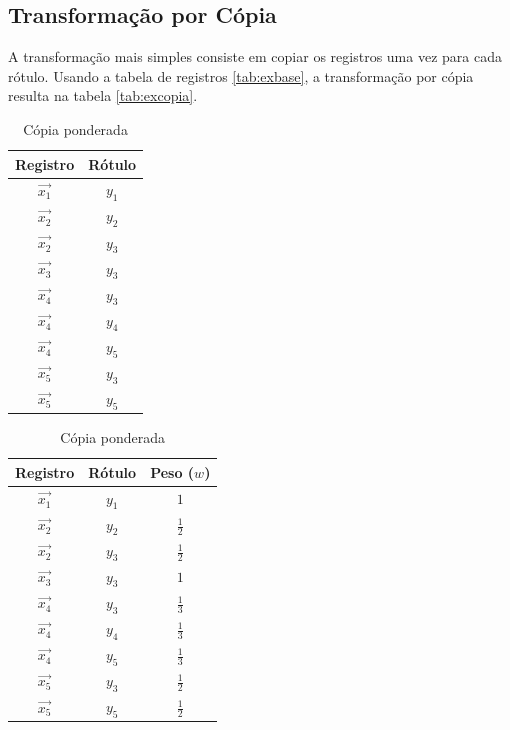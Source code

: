 \documentclass[runningheads,a4paper]{llncs}
\begin{document}
\subsection{Transformação por Cópia} \label{subsec:copia}

A transformação mais simples consiste em copiar os registros uma vez para cada rótulo. Usando a tabela de registros \ref{tab:exbase}, a transformação por cópia resulta na tabela \ref{tab:excopia}.

\begin{table}
\parbox{.45\linewidth}{
	\centering
	\begin{tabular}{| c | c |}
		\hline
		\textbf{Registro} & \textbf{Rótulo} \\
		\hline
		$\vec{x_1}$ & $y_1$ \\
		\hline
		$\vec{x_2}$ & $y_2$ \\
		\hline
		$\vec{x_2}$ & $y_3$ \\
		\hline
		$\vec{x_3}$ & $y_3$ \\
		\hline
		$\vec{x_4}$ & $y_3$ \\
		\hline
		$\vec{x_4}$ & $y_4$ \\
		\hline
		$\vec{x_4}$ & $y_5$ \\
		\hline
		$\vec{x_5}$ & $y_3$ \\
		\hline
		$\vec{x_5}$ & $y_5$ \\
		\hline
	\end{tabular}
	\caption{Transformação por cópia}
	\label{tab:excopia}
}
\parbox{.45\linewidth}{
	\centering
	\begin{tabular}{| c | c | c |}
		\hline
		\textbf{Registro} & \textbf{Rótulo} & \textbf{Peso ($w$)} \\
		\hline
		$\vec{x_1}$ & $y_1$ & $1$ \\
		\hline
		$\vec{x_2}$ & $y_2$ & $\frac{1}{2}$ \\
		\hline
		$\vec{x_2}$ & $y_3$ & $\frac{1}{2}$ \\
		\hline
		$\vec{x_3}$ & $y_3$ & $1$ \\
		\hline
		$\vec{x_4}$ & $y_3$ & $\frac{1}{3}$ \\
		\hline
		$\vec{x_4}$ & $y_4$ & $\frac{1}{3}$ \\
		\hline
		$\vec{x_4}$ & $y_5$ & $\frac{1}{3}$ \\
		\hline
		$\vec{x_5}$ & $y_3$ & $\frac{1}{2}$ \\
		\hline
		$\vec{x_5}$ & $y_5$ & $\frac{1}{2}$ \\
		\hline
	\end{tabular}
	\caption{Cópia ponderada}
	\label{tab:excopiapond}
}
\end{table}
\end{document}
